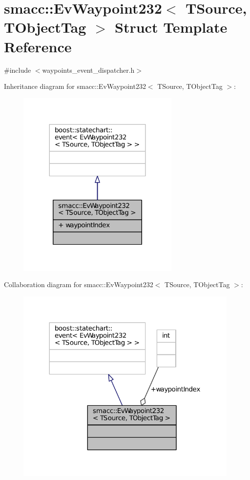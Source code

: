 \hypertarget{structsmacc_1_1EvWaypoint232}{}\section{smacc\+:\+:Ev\+Waypoint232$<$ T\+Source, T\+Object\+Tag $>$ Struct Template Reference}
\label{structsmacc_1_1EvWaypoint232}


{\ttfamily \#include $<$waypoints\+\_\+event\+\_\+dispatcher.\+h$>$}



Inheritance diagram for smacc\+:\+:Ev\+Waypoint232$<$ T\+Source, T\+Object\+Tag $>$\+:
\nopagebreak
\begin{figure}[H]
\begin{center}
\leavevmode
\includegraphics[width=227pt]{structsmacc_1_1EvWaypoint232__inherit__graph}
\end{center}
\end{figure}


Collaboration diagram for smacc\+:\+:Ev\+Waypoint232$<$ T\+Source, T\+Object\+Tag $>$\+:
\nopagebreak
\begin{figure}[H]
\begin{center}
\leavevmode
\includegraphics[width=312pt]{structsmacc_1_1EvWaypoint232__coll__graph}
\end{center}
\end{figure}
